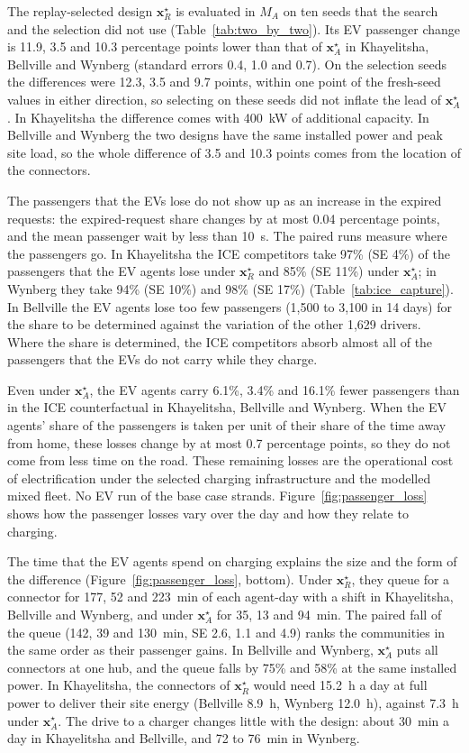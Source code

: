 \documentclass{elsarticle}
\newcommand{\MA}{\ensuremath{M_A}}
\newcommand{\xR}{\ensuremath{\mathbf{x}_R^{\star}}}
\newcommand{\xA}{\ensuremath{\mathbf{x}_A^{\star}}}
\begin{document}
The replay-selected design \(\xR\) is evaluated in \(\MA\) on ten seeds that the search and the selection did not use (Table~\ref{tab:two_by_two}). Its EV passenger change is 11.9, 3.5 and 10.3 percentage points lower than that of \(\xA\) in Khayelitsha, Bellville and Wynberg (standard errors 0.4, 1.0 and 0.7). On the selection seeds the differences were 12.3, 3.5 and 9.7 points, within one point of the fresh-seed values in either direction, so selecting on these seeds did not inflate the lead of \(\xA\). In Khayelitsha the difference comes with 400~kW of additional capacity. In Bellville and Wynberg the two designs have the same installed power and peak site load, so the whole difference of 3.5 and 10.3 points comes from the location of the connectors.

The passengers that the EVs lose do not show up as an increase in the expired requests: the expired-request share changes by at most 0.04 percentage points, and the mean passenger wait by less than 10~s. The paired runs measure where the passengers go. In Khayelitsha the ICE competitors take 97\% (SE 4\%) of the passengers that the EV agents lose under \(\xR\) and 85\% (SE 11\%) under \(\xA\); in Wynberg they take 94\% (SE 10\%) and 98\% (SE 17\%) (Table~\ref{tab:ice_capture}). In Bellville the EV agents lose too few passengers (1,500 to 3,100 in 14 days) for the share to be determined against the variation of the other 1,629 drivers. Where the share is determined, the ICE competitors absorb almost all of the passengers that the EVs do not carry while they charge.

Even under \(\xA\), the EV agents carry 6.1\%, 3.4\% and 16.1\% fewer passengers than in the ICE counterfactual in Khayelitsha, Bellville and Wynberg. When the EV agents' share of the passengers is taken per unit of their share of the time away from home, these losses change by at most 0.7 percentage points, so they do not come from less time on the road. These remaining losses are the operational cost of electrification under the selected charging infrastructure and the modelled mixed fleet. No EV run of the base case strands. Figure~\ref{fig:passenger_loss} shows how the passenger losses vary over the day and how they relate to charging.

The time that the EV agents spend on charging explains the size and the form of the difference (Figure~\ref{fig:passenger_loss}, bottom). Under \xR, they queue for a connector for 177, 52 and 223~min of each agent-day with a shift in Khayelitsha, Bellville and Wynberg, and under \xA{} for 35, 13 and 94~min. The paired fall of the queue (142, 39 and 130~min, SE 2.6, 1.1 and 4.9) ranks the communities in the same order as their passenger gains. In Bellville and Wynberg, \xA{} puts all connectors at one hub, and the queue falls by 75\% and 58\% at the same installed power. In Khayelitsha, the connectors of \xR{} would need 15.2~h a day at full power to deliver their site energy (Bellville 8.9~h, Wynberg 12.0~h), against 7.3~h under \xA. The drive to a charger changes little with the design: about 30~min a day in Khayelitsha and Bellville, and 72 to 76~min in Wynberg.
\end{document}
